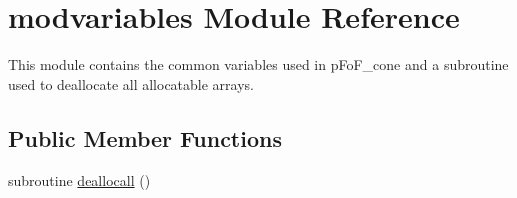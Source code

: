 \hypertarget{classmodvariables}{\section{modvariables Module Reference}
\label{classmodvariables}
}


This module contains the common variables used in p\-Fo\-F\-\_\-cone and a subroutine used to deallocate all allocatable arrays.  


\subsection*{Public Member Functions}
\begin{DoxyCompactItemize}
\item 
subroutine \hyperlink{classmodvariables_a1b90ef0a0d8979fdfc0a578bbd2f3e17}{deallocall} ()
\end{DoxyCompactItemize}

